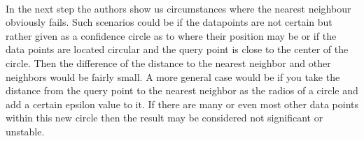 \documentclass[a4paper,psfig,subfigure,epsfig,fleqn,amssmb,float,caption,fontenc,ausarbeitung]{article}
\begin{document}
\paragraph{}
In the next step the authors show us circumstances where the nearest neighbour obviously fails. Such scenarios could be if the datapoints are not certain but rather given as a confidence circle as to where their position may be or if the data points are located circular and the query point is close to the center of the circle. Then the difference of the distance to the nearest neighbor and other neighbors would be fairly small. 
A more general case would be if you take the distance from the query point to the nearest neighbor as the radios of a circle and add a certain epsilon value to it. If there are many or even most other data points within this new circle then the result may be considered not significant or unstable. 
\paragraph{}
\end{document}
